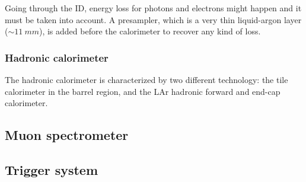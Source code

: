 Going through the ID, energy loss for photons and electrons might happen and it must be taken into account. A presampler, which is a very thin liquid-argon layer ($\sim \SI{11}{mm}$), is added before the calorimeter to recover any kind of loss.

\subsubsection{Hadronic calorimeter}
The hadronic calorimeter is characterized by two different technology: the tile calorimeter in the barrel region, and the LAr hadronic forward and end-cap calorimeter.

\subsection{Muon spectrometer}
\lipsum[1]

\lipsum[3]

\lipsum[4]

\subsection{Trigger system}
\lipsum[1]




